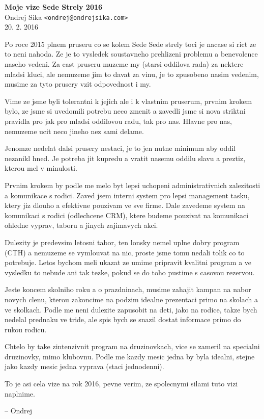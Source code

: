 \documentclass[12pt,a4paper]{article}
\begin{document}

\begin{center}
{\LARGE \bf Moje vize Sede Strely 2016}\\
\vspace*{0.4cm}
{\large Ondrej Sika {\tt <ondrej@ondrejsika.com>}}\\
\vspace*{0.3cm}
20. 2. 2016\\
\end{center}


Po roce 2015 plnem pruseru co se kolem Sede Sede strely toci je nacase si rict ze to neni nahoda. Ze je to vysledek soustavneho prehlizeni problemu a benevolence naseho vedeni. Za cast pruseru muzeme my (starsi oddilova rada) za nektere mladsi kluci, ale nemuzeme jim to davat za vinu, je to zpusobeno nasim vedenim, musime za tyto prusery vzit odpovednost i my.

Vime ze jsme byli tolerantni k jejich ale i k vlastnim pruserum, prvnim krokem bylo, ze jsme si uvedomili potrebu neco zmenit a zavedli jsme si nova striktni pravidla pro jak pro mladsi oddilovou radu, tak pro nas. Hlavne pro nas, nemuzeme ucit neco jineho nez sami delame.

Jenomze nedelat dalsi prusery nestaci, je to jen nutne minimum aby oddil nezanikl hned. Je potreba jit kupredu a vratit nasemu oddilu slavu a preztiz, kterou mel v minulosti.

Prvnim krokem by podle me melo byt lepsi uchopeni administrativnich zalezitosti a komunikace s rodici. Zaved jsem interni system pro lepsi management tasku, ktery jiz dlouho a efektivne pouzivam ve sve firme. Dale zavedeme system na komunikaci s rodici (odlechcene CRM), ktere budeme pouzivat na komunikaci ohledne vyprav, taboru a jinych zajimavych akci.

Dulezity je predevsim letosni tabor, ten lonsky nemel uplne dobry program (CTH) a nemuzeme se vymlouvat na nic, proste jsme tomu nedali tolik co to potrebuje. Letos bychom meli ukazat ze umime pripravit kvalitni program a ve vysledku to nebude ani tak tezke, pokud se do toho pustime s casovou rezervou.

Jeste koncem skolniho roku a o prazdninach, musime zahajit kampan na nabor novych clenu, kterou zakoncime na podzim idealne prezentaci primo na skolach a ve skolkach. Podle me neni dulezite zapusobit na deti, jako na rodice, takze bych nedelal prednaku ve tride, ale spis bych se snazil dostat informace primo do rukou rodicu.

Chtelo by take zintenzivnit program na druzinovkach, vice se zameril na specialni druzinovky, mimo klubovnu. Podle me kazdy mesic jedna by byla idealni, stejne jako kazdy mesic jedna vyprava (staci jednodenni).

To je asi cela vize na rok 2016, pevne verim, ze spolecnymi silami tuto vizi naplnime.

-- Ondrej
\end{document}

